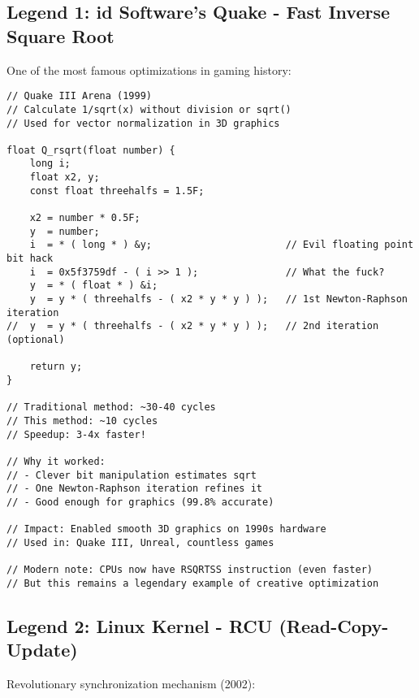\subsection{Legend 1: id Software's Quake - Fast Inverse Square Root}

One of the most famous optimizations in gaming history:

\begin{lstlisting}
// Quake III Arena (1999)
// Calculate 1/sqrt(x) without division or sqrt()
// Used for vector normalization in 3D graphics

float Q_rsqrt(float number) {
    long i;
    float x2, y;
    const float threehalfs = 1.5F;

    x2 = number * 0.5F;
    y  = number;
    i  = * ( long * ) &y;                       // Evil floating point bit hack
    i  = 0x5f3759df - ( i >> 1 );               // What the fuck?
    y  = * ( float * ) &i;
    y  = y * ( threehalfs - ( x2 * y * y ) );   // 1st Newton-Raphson iteration
//  y  = y * ( threehalfs - ( x2 * y * y ) );   // 2nd iteration (optional)

    return y;
}

// Traditional method: ~30-40 cycles
// This method: ~10 cycles
// Speedup: 3-4x faster!

// Why it worked:
// - Clever bit manipulation estimates sqrt
// - One Newton-Raphson iteration refines it
// - Good enough for graphics (99.8% accurate)

// Impact: Enabled smooth 3D graphics on 1990s hardware
// Used in: Quake III, Unreal, countless games

// Modern note: CPUs now have RSQRTSS instruction (even faster)
// But this remains a legendary example of creative optimization
\end{lstlisting}

\subsection{Legend 2: Linux Kernel - RCU (Read-Copy-Update)}

Revolutionary synchronization mechanism (2002):

